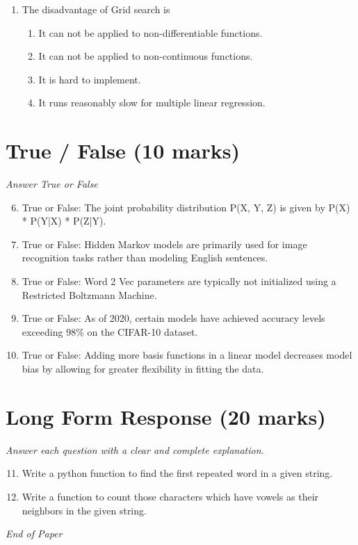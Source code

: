 \documentclass[12pt]{article}
\begin{document}
\begin{enumerate}[label=\arabic*.]
\begin{enumerate}[label=(\alph*)]
    \item Whether we learn the weights by matrix inversion or gradient descent
    \item The assumed variance of the Gaussian noise
    \item The use of a constant-term unit input
\end{enumerate}
\item The disadvantage of Grid search is
\begin{enumerate}[label=(\alph*)]
    \item It can not be applied to non-differentiable functions.
    \item It can not be applied to non-continuous functions.
    \item It is hard to implement.
    \item It runs reasonably slow for multiple linear regression.
\end{enumerate}
\end{enumerate}

\section*{True / False (10 marks)}
\textit{Answer True or False}
\begin{enumerate}[label=\arabic*.]
\setcounter{enumi}{5}
\item True or False: The joint probability distribution P(X, Y, Z) is given by P(X) * P(Y|X) * P(Z|Y).
\item True or False: Hidden Markov models are primarily used for image recognition tasks rather than modeling English sentences.
\item True or False: Word 2 Vec parameters are typically not initialized using a Restricted Boltzmann Machine.
\item True or False: As of 2020, certain models have achieved accuracy levels exceeding 98\% on the CIFAR-10 dataset.
\item True or False: Adding more basis functions in a linear model decreases model bias by allowing for greater flexibility in fitting the data.
\end{enumerate}

\section*{Long Form Response (20 marks)}
\textit{Answer each question with a clear and complete explanation.}
\begin{enumerate}[label=\arabic*.]
\setcounter{enumi}{10}
\item Write a python function to find the first repeated word in a given string.
\item Write a function to count those characters which have vowels as their neighbors in the given string.
\end{enumerate}

\vfill
\noindent\textit{End of Paper}
\end{document}
